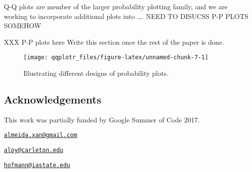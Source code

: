 Q-Q plots are member of the larger probability plotting family, and we
are working to incorporate additional plots into \ldots{}.
NEED TO DISUCSS P-P PLOTS SOMEHOW

XXX P-P plots here Write this section once the rest of the paper is
done.

\begin{Schunk}
\begin{figure}

{\centering \texttt{[image: qqplotr\_files/figure-latex/unnamed-chunk-7-1]} 

}

\caption{\label{fig:pp-designs}Illustrating different designs of probability plots.}\label{fig:unnamed-chunk-7}
\end{figure}
\end{Schunk}



\subsection{Acknowledgements}\label{acknowledgements}

This work was partially funded by Google Summer of Code 2017.

\address{%
Alexandre Almeida\\
University of Campinas\\
Institute of Computing\\ Campinas, Brazil 13083-852\\
}
\href{mailto:almeida.xan@gmail.com}{\nolinkurl{almeida.xan@gmail.com}}

\address{%
Adam Loy\\
Carleton College\\
Department of Mathematics and Statistics\\ Northfield, MN 55057\\
}
\href{mailto:aloy@carleton.edu}{\nolinkurl{aloy@carleton.edu}}

\address{%
Heike Hofmann\\
Iowa State University\\
Department of Statistics\\ Ames, IA 50011-1210\\
}
\href{mailto:hofmann@iastate.edu}{\nolinkurl{hofmann@iastate.edu}}

